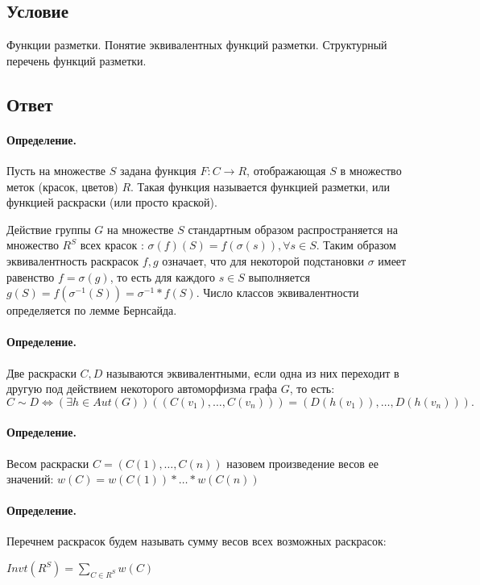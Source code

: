 \documentclass{report}
\begin{document}
\subsection{Условие}
Функции разметки. Понятие эквивалентных функций разметки. Структурный перечень
функций разметки.

\subsection{Ответ}
\paragraph*{Определение.}
Пусть на множестве $S$ задана функция  $F: C \to R$, отображающая $S$ в
множество меток (красок, цветов)  $R$. Такая функция называется функцией разметки,
или функцией раскраски (или просто краской).

\medskip

Действие группы  $G$ на множестве  $S$ стандартным образом распространяется
на множество  $R^{S}$ всех красок : $\sigma(f)(S) = f(\sigma(s)), \forall s \in S$.
Таким образом эквивалентность раскрасок $f,g$ означает, что для некоторой
подстановки  $\sigma$ имеет равенство  $f = \sigma(g)$, то есть
для каждого $s \in S$ выполняется $g(S) = f(\sigma^{-1}(S)) = \sigma^{-1}*f(S)$. Число
классов эквивалентности определяется по лемме Бернсайда.

\paragraph*{Определение.}
Две раскраски $C, D$ называются эквивалентными, если одна из них переходит в другую
под действием некоторого автоморфизма графа  $G$, то есть:
 \[
C \sim D \iff (\exists h \in Aut(G))((C(v_1), \ldots, C(v_{n}))) = 
(D(h(v_1)), \ldots, D(h(v_{n}))).
\] 

\paragraph*{Определение.}
Весом раскраски $C = (C(1), \ldots, C(n))$ назовем произведение весов ее значений:
$w(C) = w(C(1)) * \ldots * w(C(n))$

\paragraph*{Определение.}
Перечнем раскрасок будем называть сумму весов всех возможных раскрасок:

$Invt(R^{S}) = \sum_{C \in R^{S}} w(C)$ 
\end{document}
